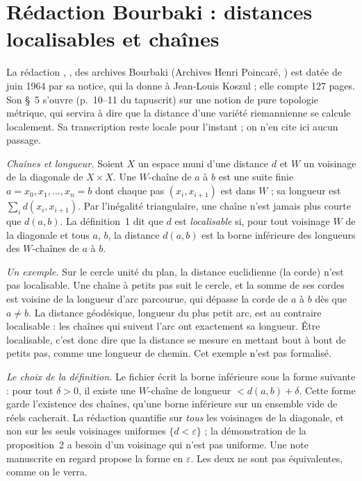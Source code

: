 \section[Rédaction Bourbaki \redac{402} : distances localisables]{Rédaction Bourbaki  : distances localisables et chaînes\protect{}}\label{sec:bourbaki-402}

La rédaction , , des archives Bourbaki (Archives Henri Poincaré, ) est datée de juin 1964 par sa notice, qui la donne à Jean-Louis Koszul ; elle compte 127 pages. Son §~5 s'ouvre (p.~10--11 du tapuscrit) sur une notion de pure topologie métrique, qui servira à dire que la distance d'une variété riemannienne se calcule localement. Sa transcription reste locale pour l'instant ; on n'en cite ici aucun passage.

\emph{Chaînes et longueur.} Soient $X$ un espace muni d'une distance $d$ et $W$ un voisinage de la diagonale de $X \times X$. Une $W$-chaîne de $a$ à $b$ est une suite finie $a = x_0, x_1, \dots, x_n = b$ dont chaque pas $(x_i, x_{i+1})$ est dans $W$ ; sa longueur est $\sum_i d(x_i, x_{i+1})$. Par l'inégalité triangulaire, une chaîne n'est jamais plus courte que $d(a, b)$. La définition~1 dit que $d$ est \emph{localisable} si, pour tout voisinage $W$ de la diagonale et tous $a$, $b$, la distance $d(a, b)$ est la borne inférieure des longueurs des $W$-chaînes de $a$ à $b$.

\emph{Un exemple.} Sur le cercle unité du plan, la distance euclidienne (la corde) n'est pas localisable. Une chaîne à petits pas suit le cercle, et la somme de ses cordes est voisine de la longueur d'arc parcourue, qui dépasse la corde de $a$ à $b$ dès que $a \neq b$. La distance géodésique, longueur du plus petit arc, est au contraire localisable : les chaînes qui suivent l'arc ont exactement sa longueur. Être localisable, c'est donc dire que la distance se mesure en mettant bout à bout de petits pas, comme une longueur de chemin. Cet exemple n'est pas formalisé.

\emph{Le choix de la définition.} Le fichier écrit la borne inférieure sous la forme suivante : pour tout $\delta > 0$, il existe une $W$-chaîne de longueur $< d(a, b) + \delta$. Cette forme garde l'existence des chaînes, qu'une borne inférieure sur un ensemble vide de réels cacherait. La rédaction quantifie sur \emph{tous} les voisinages de la diagonale, et non sur les seuls voisinages uniformes $\{d < \varepsilon\}$ ; la démonstration de la proposition~2 a besoin d'un voisinage qui n'est pas uniforme. Une note manuscrite en regard propose la forme en $\varepsilon$. Les deux ne sont pas équivalentes, comme on le verra.

